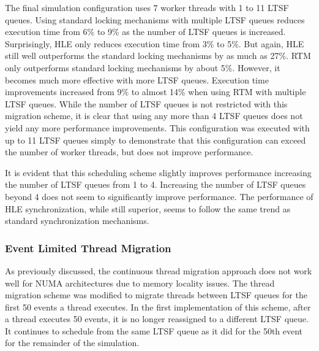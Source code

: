 \documentclass[11pt]{book}
\begin{document}
The final simulation configuration uses 7 worker threads with 1 to 11 LTSF
queues.  Using standard locking mechanisms with multiple LTSF queues reduces
execution time from 6\% to  9\% as the number of LTSF queues is increased.
Surprisingly, HLE only reduces execution time from 3\% to 5\%.  But again, HLE
still well outperforms the standard locking mechanisms by as much as 27\%.  RTM
only outperforms standard locking mechanisms by about 5\%.  However, it
becomes much more effective with more LTSF queues.  Execution time
improvements increased from 9\% to almost 14\% when using RTM with multiple LTSF queues.
While the number of LTSF queues is not restricted with this migration scheme, it
is clear that using any more than 4 LTSF queues does not yield any more
performance improvements.  This configuration was executed with up to 11 LTSF
queues simply to demonstrate that this configuration can exceed the number of worker
threads, but does not improve performance.

It is evident that this scheduling scheme slightly improves performance increasing the
number of LTSF queues from 1 to 4.  Increasing the number of LTSF queues beyond 4 does not
seem to significantly improve performance.  The performance of HLE synchronization, while
still superior, seems to follow the same trend as standard synchronization mechanisms.

\subsubsection{Event Limited Thread Migration}


As previously discussed, the continuous thread migration approach does not work well for
NUMA architectures due to memory locality issues.  The thread migration scheme was
modified to migrate threads between LTSF queues for the first 50 events a thread executes.
In the first implementation of this scheme, after a thread executes 50 events,
it is no longer reassigned to a different LTSF queue.  It continues to schedule
from the same LTSF queue as it did for the 50th event for the remainder of the
simulation. 
\end{document}
